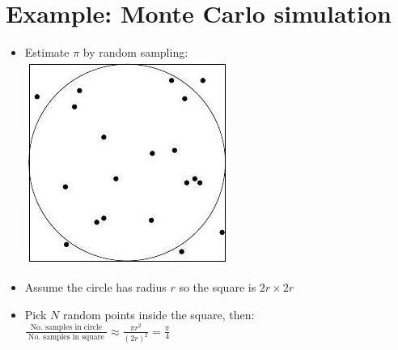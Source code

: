 \documentclass[10pt]{article}
\begin{document}
\section*{Example: Monte Carlo simulation}
\begin{itemize}
  \item Estimate $\pi$ by random sampling:\\
\includegraphics[max width=\textwidth, center]{2025_05_12_520db7cd238ba7b44f0fg-03}
  \item Assume the circle has radius $r$ so the square is $2 r \times 2 r$
  \item Pick $N$ random points inside the square, then:\\
$\frac{\text { No. samples in circle }}{\text { No. samples in square }} \approx \frac{\pi r^{2}}{(2 r)^{2}}=\frac{\pi}{4}$
\end{itemize}
\end{document}
